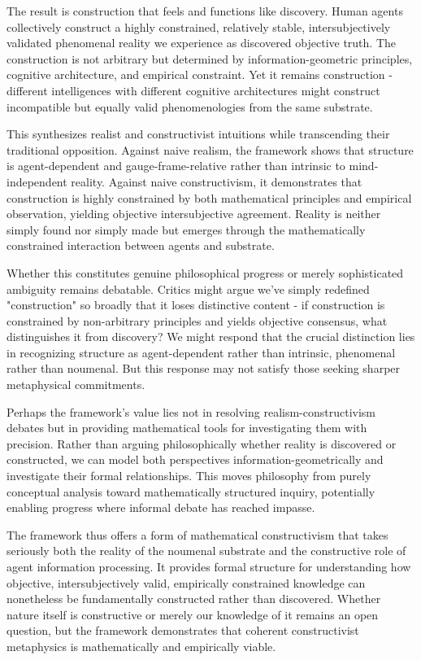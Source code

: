 \documentclass[11pt]{article}
\begin{document}
The result is construction that feels and functions like discovery. Human agents collectively construct a highly constrained, relatively stable, intersubjectively validated phenomenal reality we experience as discovered objective truth. The construction is not arbitrary but determined by information-geometric principles, cognitive architecture, and empirical constraint. Yet it remains construction - different intelligences with different cognitive architectures might construct incompatible but equally valid phenomenologies from the same substrate.

This synthesizes realist and constructivist intuitions while transcending their traditional opposition. Against naive realism, the framework shows that structure is agent-dependent and gauge-frame-relative rather than intrinsic to mind-independent reality. Against naive constructivism, it demonstrates that construction is highly constrained by both mathematical principles and empirical observation, yielding objective intersubjective agreement. Reality is neither simply found nor simply made but emerges through the mathematically constrained interaction between agents and substrate.

Whether this constitutes genuine philosophical progress or merely sophisticated ambiguity remains debatable. Critics might argue we've simply redefined "construction" so broadly that it loses distinctive content - if construction is constrained by non-arbitrary principles and yields objective consensus, what distinguishes it from discovery? We might respond that the crucial distinction lies in recognizing structure as agent-dependent rather than intrinsic, phenomenal rather than noumenal. But this response may not satisfy those seeking sharper metaphysical commitments.

Perhaps the framework's value lies not in resolving realism-constructivism debates but in providing mathematical tools for investigating them with precision. Rather than arguing philosophically whether reality is discovered or constructed, we can model both perspectives information-geometrically and investigate their formal relationships. This moves philosophy from purely conceptual analysis toward mathematically structured inquiry, potentially enabling progress where informal debate has reached impasse.

The framework thus offers a form of mathematical constructivism that takes seriously both the reality of the noumenal substrate and the constructive role of agent information processing. It provides formal structure for understanding how objective, intersubjectively valid, empirically constrained knowledge can nonetheless be fundamentally constructed rather than discovered. Whether nature itself is constructive or merely our knowledge of it remains an open question, but the framework demonstrates that coherent constructivist metaphysics is mathematically and empirically viable.
\end{document}
